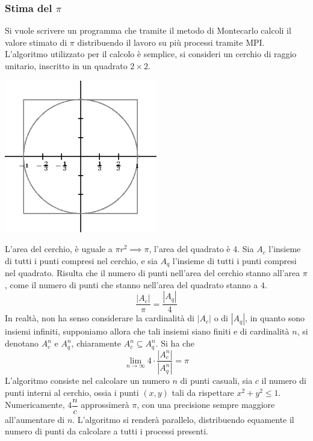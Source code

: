 \documentclass[10pt, letterpaper]{report}
\begin{document}
\subsubsection{Stima del $\pi$}
Si vuole scrivere un programma che tramite il metodo di Montecarlo calcoli il valore stimato di $\pi$ distribuendo il 
lavoro su più processi tramite MPI. L'algoritmo utilizzato per il calcolo è semplice, si consideri un cerchio di 
raggio unitario, inscritto in un quadrato $2\times 2$.\begin{center}
    \includegraphics[width=0.5\textwidth]{images/cerchio.eps}
\end{center}
L'area del cerchio, è uguale a $\pi r^2\implies \pi$, l'area del quadrato è $4$. Sia $A_c$ l'insieme di tutti i 
punti compresi nel cerchio, e sia $A_q$ l'insieme di tutti i punti compresi nel quadrato. Risulta che il numero di punti 
nell'area del cerchio stanno all'area $\pi$, come il numero di punti che stanno nell'area del quadrato stanno a $4$.
$$ \dfrac{|A_c|}{\pi}=\dfrac{|A_q|}{4}$$
In realtà, non ha senso considerare la cardinalità di $|A_c|$ o di $|A_q|$, in quanto sono insiemi infiniti, supponiamo allora 
che tali insiemi siano finiti e di cardinalità $n$, si denotano $A_c^n$ e $A_q^n$, chiaramente $A_c^n\subseteq A_q^n$. 
Si ha che 
$$ \lim_{n\rightarrow \infty} 4\cdot \dfrac{|A_c^n|}{|A_q^n|} = \pi$$
L'algoritmo consiste nel calcolare un numero $n$ di punti casuali, sia $c$ il numero di punti interni al cerchio, ossia 
i punti $(x,y)$ tali da rispettare $x^2+y^2\le 1$. Numericamente, $4\dfrac{n}{c}$ approssimerà $\pi$, con una precisione 
sempre maggiore all'aumentare di $n$.\acc 
L'algoritmo si renderà parallelo, distribuendo equamente il numero di punti da calcolare a tutti i processi presenti.
\end{document}

